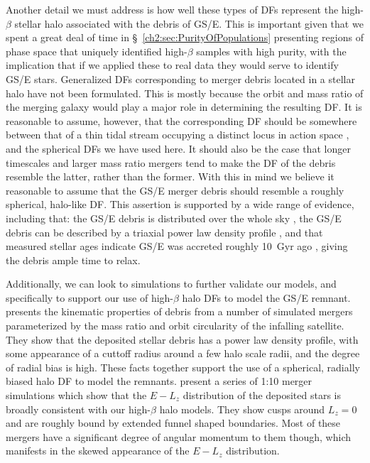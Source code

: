 Another detail we must address is how well these types of DFs represent the high-$\beta$ stellar halo associated with the debris of GS/E. This is important given that we spent a great deal of time in \S~\ref{ch2:sec:PurityOfPopulations} presenting regions of phase space that uniquely identified high-$\beta$ samples with high purity, with the implication that if we applied these to real data they would serve to identify GS/E stars. Generalized DFs corresponding to merger debris located in a stellar halo have not been formulated. This is mostly because the orbit and mass ratio of the merging galaxy would play a major role in determining the resulting DF. It is reasonable to assume, however, that the corresponding DF should be somewhere between that of a thin tidal stream occupying a distinct locus in action space \parencite[e.g.][]{bovy14}, and the spherical DFs we have used here. It should also be the case that longer timescales and larger mass ratio mergers tend to make the DF of the debris resemble the latter, rather than the former. With this in mind we believe it reasonable to assume that the GS/E merger debris should resemble a roughly spherical, halo-like DF. This assertion is supported by a wide range of evidence, including that: the GS/E debris is distributed over the whole sky \parencite[see Figure 12 in ][]{helmi20}, the GS/E debris can be described by a triaxial power law density profile \parencite{mackereth20}, and that measured stellar ages indicate GS/E was accreted roughly 10~Gyr ago \parencite{montalban21}, giving the debris ample time to relax.

Additionally, we can look to simulations to further validate our models, and specifically to support our use of high-$\beta$ halo DFs to model the GS/E remnant. \textcite{amorisco17} presents the kinematic properties of debris from a number of simulated mergers parameterized by the mass ratio and orbit circularity of the infalling satellite. They show that the deposited stellar debris has a power law density profile, with some appearance of a cuttoff radius around a few halo scale radii, and the degree of radial bias is high. These facts together support the use of a spherical, radially biased halo DF to model the remnants. \textcite{jean-baptiste17} present a series of 1:10 merger simulations which show that the $E-L_{z}$ distribution of the deposited stars is broadly consistent with our high-$\beta$ halo models. They show cusps around $L_{z}=0$ and are roughly bound by extended funnel shaped boundaries. Most of these mergers have a significant degree of angular momentum to them though, which manifests in the skewed appearance of the $E-L_{z}$ distribution.

